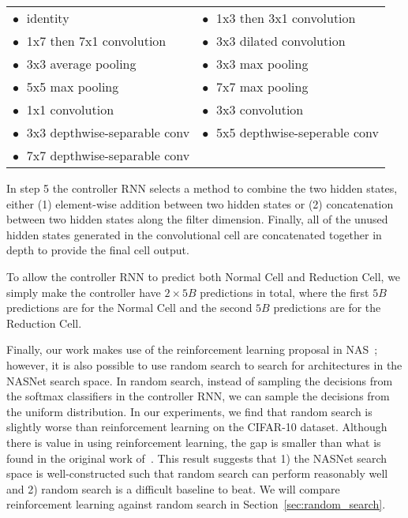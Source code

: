 \documentclass[10pt,twocolumn,letterpaper]{article}
\begin{document}
\begin{table}[H]
\footnotesize
\setlength{\tabcolsep}{0.5em} %
\centering
\def\arraystretch{1.0}
\begin{tabular}{ll}
$\bullet\;$ identity & $\bullet\;$ 1x3 then 3x1 convolution \\
$\bullet\;$ 1x7 then 7x1 convolution & $\bullet\;$ 3x3 dilated convolution \\
$\bullet\;$ 3x3 average pooling & $\bullet\;$ 3x3 max pooling \\
$\bullet\;$ 5x5 max pooling & $\bullet\;$ 7x7 max pooling \\
$\bullet\;$ 1x1 convolution & $\bullet\;$ 3x3 convolution \\
$\bullet\;$ 3x3 depthwise-separable conv & $\bullet\;$ 5x5 depthwise-seperable conv \\
$\bullet\;$ 7x7 depthwise-separable conv \\
\end{tabular}
\end{table}%

In step 5 the controller RNN selects a method to combine the two hidden states, either (1) element-wise addition between two hidden states or (2) concatenation between two hidden states along the filter dimension.
Finally, all of the unused hidden states generated in the convolutional cell are concatenated together in depth to provide the final cell output.


To allow the controller RNN to predict both Normal Cell and Reduction Cell, we simply make the controller have $2\times 5B$ predictions in total, where the first $5B$ predictions are for the Normal Cell and the second $5B$ predictions are for the Reduction Cell.

Finally, our work makes use of the reinforcement learning proposal in NAS~\cite{zoph2017neural}; however, it is also possible to use random search to search for architectures in the NASNet search space. In random search, instead of sampling the decisions from the softmax classifiers in the controller RNN, we can sample the decisions from the uniform distribution. In our experiments, we find that random search is slightly worse than reinforcement learning on the CIFAR-10 dataset. Although there is value in using reinforcement learning, the gap is smaller than what is found in the original work of~\cite{zoph2017neural}. This result suggests that 1) the NASNet search space is  well-constructed such that random search can perform reasonably well and 2) random search is a difficult baseline to beat. We will compare reinforcement learning against random search in Section~\ref{sec:random_search}.
\end{document}
